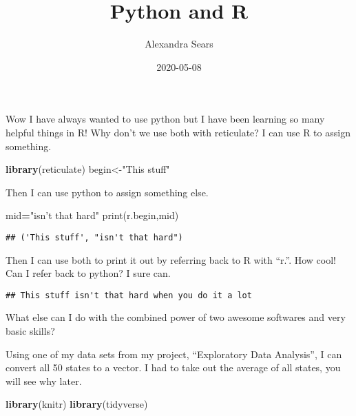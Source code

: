 \documentclass[]{article}
\title{Python and R}
\author{Alexandra Sears}
\date{2020-05-08}
\newenvironment{Shaded}{\begin{snugshade}}{\end{snugshade}}
\newcommand{\BuiltInTok}[1]{#1}
\newcommand{\KeywordTok}[1]{\textcolor[rgb]{0.13,0.29,0.53}{\textbf{#1}}}
\newcommand{\NormalTok}[1]{#1}
\newcommand{\OperatorTok}[1]{\textcolor[rgb]{0.81,0.36,0.00}{\textbf{#1}}}
\newcommand{\StringTok}[1]{\textcolor[rgb]{0.31,0.60,0.02}{#1}}
\begin{document}
\maketitle

Wow I have always wanted to use python but I have been learning so many
helpful things in R! Why don't we use both with reticulate? I can use R
to assign something.

\begin{Shaded}
\begin{Highlighting}[]
\KeywordTok{library}\NormalTok{(reticulate)}
\NormalTok{begin<-}\StringTok{"This stuff"}
\end{Highlighting}
\end{Shaded}

Then I can use python to assign something else.

\begin{Shaded}
\begin{Highlighting}[]
\NormalTok{mid}\OperatorTok{=}\StringTok{"isn't that hard"}
\BuiltInTok{print}\NormalTok{(r.begin,mid)}
\end{Highlighting}
\end{Shaded}

\begin{verbatim}
## ('This stuff', "isn't that hard")
\end{verbatim}

Then I can use both to print it out by referring back to R with ``r.''.
How cool! Can I refer back to python? I sure can.

\begin{Shaded}
\end{Shaded}

\begin{verbatim}
## This stuff isn't that hard when you do it a lot
\end{verbatim}

What else can I do with the combined power of two awesome softwares and
very basic skills?

Using one of my data sets from my project, ``Exploratory Data
Analysis'', I can convert all 50 states to a vector. I had to take out
the average of all states, you will see why later.

\begin{Shaded}
\begin{Highlighting}[]
\KeywordTok{library}\NormalTok{(knitr) }
\KeywordTok{library}\NormalTok{(tidyverse)}
\end{Highlighting}
\end{Shaded}
\end{document}

